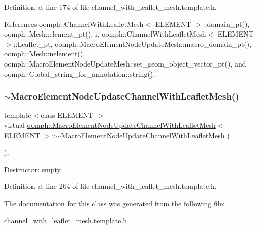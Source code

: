 Definition at line 174 of file channel\+\_\+with\+\_\+leaflet\+\_\+mesh.\+template.\+h.



References oomph\+::\+Channel\+With\+Leaflet\+Mesh$<$ E\+L\+E\+M\+E\+N\+T $>$\+::domain\+\_\+pt(), oomph\+::\+Mesh\+::element\+\_\+pt(), i, oomph\+::\+Channel\+With\+Leaflet\+Mesh$<$ E\+L\+E\+M\+E\+N\+T $>$\+::\+Leaflet\+\_\+pt, oomph\+::\+Macro\+Element\+Node\+Update\+Mesh\+::macro\+\_\+domain\+\_\+pt(), oomph\+::\+Mesh\+::nelement(), oomph\+::\+Macro\+Element\+Node\+Update\+Mesh\+::set\+\_\+geom\+\_\+object\+\_\+vector\+\_\+pt(), and oomph\+::\+Global\+\_\+string\+\_\+for\+\_\+annotation\+::string().

\mbox{\label{classoomph_1_1MacroElementNodeUpdateChannelWithLeafletMesh_a5debbfa68133a5ad9bd621b24b2fd086}} 
\subsubsection{\texorpdfstring{$\sim$\+Macro\+Element\+Node\+Update\+Channel\+With\+Leaflet\+Mesh()}{~MacroElementNodeUpdateChannelWithLeafletMesh()}}
{\footnotesize\ttfamily template$<$class E\+L\+E\+M\+E\+NT $>$ \\
virtual \hyperlink{classoomph_1_1MacroElementNodeUpdateChannelWithLeafletMesh}{oomph\+::\+Macro\+Element\+Node\+Update\+Channel\+With\+Leaflet\+Mesh}$<$ E\+L\+E\+M\+E\+NT $>$\+::$\sim$\hyperlink{classoomph_1_1MacroElementNodeUpdateChannelWithLeafletMesh}{Macro\+Element\+Node\+Update\+Channel\+With\+Leaflet\+Mesh} (\begin{DoxyParamCaption}{ }\end{DoxyParamCaption})\hspace{0.3cm}{\ttfamily [inline]}, {\ttfamily [virtual]}}



Destructor\+: empty. 



Definition at line 264 of file channel\+\_\+with\+\_\+leaflet\+\_\+mesh.\+template.\+h.



The documentation for this class was generated from the following file\+:\begin{DoxyCompactItemize}
\item 
\hyperlink{channel__with__leaflet__mesh_8template_8h}{channel\+\_\+with\+\_\+leaflet\+\_\+mesh.\+template.\+h}\end{DoxyCompactItemize}
